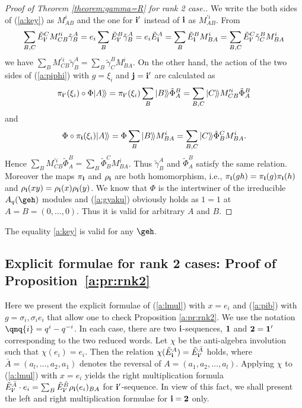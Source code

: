 \begin{proof}[Proof of Theorem \ref{theorem:gamma=R} for rank 2 case.]
We write the both sides of (\ref{a:key}) as $M^i_{AB}$ and the one
for ${\bf i}'$ instead of ${\bf i}$ as $M^{\prime i}_{AB}$.
From
\begin{gather*}
\sum_{B,C} {\tilde E}^C_{{\bf i}'} M^{\prime i}_{CB}{\tilde \gamma}^A_B=
e_i \sum_B {\tilde E}^B_{{\bf i}'}{\tilde \gamma}^A_B =
e_i {\tilde E}^A_{\bf i} = \sum_B {\tilde E}^{B}_{\bf i}  M^i_{BA}
= \sum_{B,C}{\tilde E}^C_{{\bf i}'}
{\tilde \gamma}^B_C M^i_{BA}
\end{gather*}
we have
$\sum_{B} M^{\prime i}_{CB}{\tilde \gamma}^A_B
= \sum_{B}{\tilde \gamma}^B_CM^i_{BA}$.
On the other hand, the action of the two sides of (\ref{a:piphi}) with
$g=\xi_i$ and
${\bf j}={\bf i}'$ are calculated as
\[
\pi_{{\bf i}'}(\xi_i)\circ \Phi|A\rangle\!\rangle
=\pi_{{\bf i}'}(\xi_i)\sum_B|B\rangle\!\rangle{\tilde \Phi}^B_A
=\sum_{B,C}|C\rangle\!\rangle
M_{CB}^{\prime i}{\tilde \Phi}_A^B
\]
and
\[
\Phi \circ \pi_{{\bf i}}(\xi_i)|A\rangle\!\rangle
=\Phi\sum_B|B\rangle\!\rangle M_{BA}^i
=\sum_{B,C}|C\rangle\!\rangle {\tilde \Phi}_B^C M_{BA}^i.
\]
Hence
$\sum_{B}
M_{CB}^{\prime i}{\tilde \Phi}_A^B
= \sum_{B}{\tilde \Phi}_B^C M_{BA}^i$.
Thus ${\tilde \gamma}^A_B$ and ${\tilde \Phi}^B_A$
satisfy the same relation.
Moreover the maps $\pi_{\bf i}$ and
$\rho_{\bf i}$ are both homomorphism, i.e.,
$\pi_{\bf i}(gh)=\pi_{\bf i}(g)\pi_{\bf i}(h)$
and
$\rho_{\bf i}(xy)=\rho_{\bf i}(x)\rho_{\bf i}(y)$.
We know that ${\Phi}$ is the intertwiner of the
irreducible $A_q(\geh)$ modules and
(\ref{a:gyaku}) obviously holds as $1=1$ at
$A=B=(0,\ldots,0)$.
Thus it is valid for arbitrary $A$ and $B$.
\end{proof}

\begin{conjecture}
The equality \eqref{a:key} is valid for any $\geh$.
\end{conjecture}

\subsection{Explicit formulae for rank 2 cases:
Proof of Proposition~\ref{a:pr:rnk2}}\label{a:ss:rank2}

Here we present the explicit formulae of
(\ref{a:lmul}) with $x=e_i$
and (\ref{a:pib}) with $g=\sigma_i, \sigma_ie_i$ that allow one to check
Proposition \ref{a:pr:rnk2}.
We use the notation $\qmq{i}=q^i-q^{-i}$.
In each case, there are two ${\bf i}$-sequences,
${\bf 1}$ and ${\bf 2}={\bf 1}'$
corresponding to the two reduced words.
Let $\chi$ be the anti-algebra involution
such that $\chi(e_i)=e_i$.
Then the relation
$\chi({\tilde E}^{A}_{\bf i}) = {\tilde E}^{\bar A}_{{\bf i}'}$ holds,
where ${\bar A} = (a_l,\ldots, a_2,a_1)$ denotes the reversal of
$A=(a_1,a_2,\ldots, a_l)$.
Applying $\chi$ to (\ref{a:lmul}) with $x=e_i$ yields the
right multiplication formula
${\tilde E}^{\bar A}_{{\bf i}'}\cdot e_i  = \sum_B  {\tilde E}^{\bar B}_{{\bf i}'}
\rho_{\bf i}(e_i)_{BA}$ for ${\bf i}'$-sequence.
In view of this fact, we shall present
the left and right multiplication formulae
for ${\bf i}={\bf 2}$ only.

